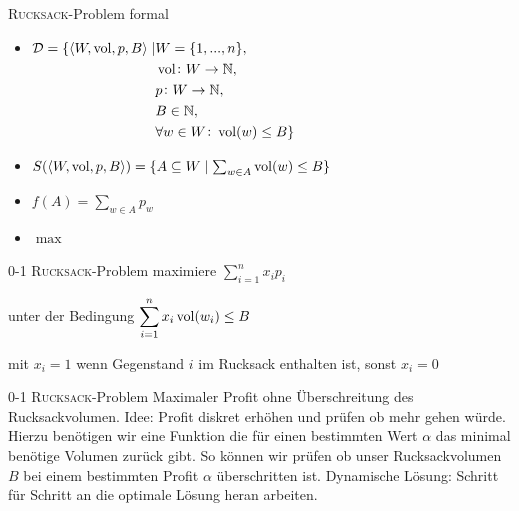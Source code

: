 \begin{frame}{\textsc{Rucksack}-Problem formal}
    \begin{itemize}
        \item $\begin{aligned}[t] 
            \mathcal{D}=\{\langle W,\operatorname{vol},p,B \rangle \mid & W=\{1,...,n\}, & \\
                                                                & \operatorname{vol} \colon W \to \mathbb{N}, & \\
                                                                & p \colon W \to \mathbb{N}, & \\
                                                                & B \in \mathbb{N}, & \\
                                                                & \forall w \in W \colon \operatorname{vol}(w) \leq B \}
         \end{aligned}$
        
        \item $S( \langle W, \operatorname{vol}, p, B \rangle )=\{ A \subseteq W \mid \sum_{w\in A}{ \operatorname{vol}(w)} \leq B \}$
        \item $f(A)=\sum_{w\in A}{p_w}$
        \item $\max$
    \end{itemize}
\end{frame}
\begin{frame}{0-1 \textsc{Rucksack}-Problem}
    maximiere $\displaystyle \sum_{i=1}^{n}{x_i p_i}$
       
    unter der Bedingung $\displaystyle \sum_{i=1}^{n}{x_i \operatorname{vol}(w_i) \leq B}$
       
    mit $x_i=1$ wenn Gegenstand $i$ im Rucksack enthalten ist, sonst $x_i=0$
\end{frame}
\begin{frame}{0-1 \textsc{Rucksack}-Problem}
    Maximaler Profit ohne Überschreitung des Rucksackvolumen.
    Idee: Profit diskret erhöhen und prüfen ob mehr gehen würde.
    Hierzu benötigen wir eine Funktion die für einen bestimmten Wert $\alpha$ das minimal benötige Volumen zurück gibt.
    So können wir prüfen ob unser Rucksackvolumen $B$ bei einem bestimmten Profit $\alpha$ überschritten ist.
    Dynamische Lösung: Schritt für Schritt an die optimale Lösung heran arbeiten.
\end{frame}
